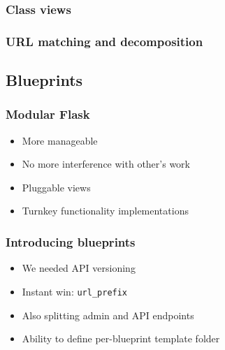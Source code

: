 \documentclass[14pt]{beamer}
\begin{document}
\begin{frame}
  \frametitle{Class views}

\end{frame}

\begin{frame}
  \frametitle{URL matching and decomposition}
\end{frame}

\subsection{Blueprints}

\begin{frame}
  \frametitle{Modular Flask}
  \begin{itemize}
  \item More manageable
  \item No more interference with other's work
  \item Pluggable views
  \item Turnkey functionality implementations
  \end{itemize}
\end{frame}

\begin{frame}
  \frametitle{Introducing blueprints}
  \begin{itemize}
  \item We needed API versioning
  \item Instant win: \texttt{url\_prefix}
  \item Also splitting admin and API endpoints
  \item Ability to define per-blueprint template folder
  \end{itemize}
\end{frame}
\end{document}
